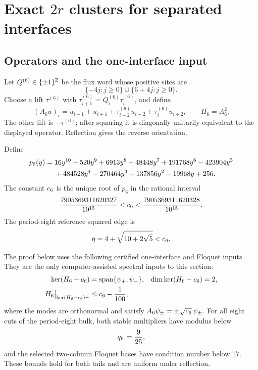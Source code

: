 \section{Exact \texorpdfstring{\(2r\)}{2r} clusters for separated interfaces}
\label{sec:exact-2r}

\subsection{Operators and the one-interface input}

Let \(Q^{(6)}\in\{\pm1\}^{\mathbb Z}\) be the flux word whose positive sites are
\[
 \{ -4j:j\geq 0\}\cup\{6+4j:j\geq0\}.
\]
Choose a lift \(\tau^{(6)}\) with
\(\tau^{(6)}_{i+1}=Q^{(6)}_i\tau^{(6)}_i\), and define
\begin{equation}
 (A_6u)_i=u_{i-1}+u_{i+1}
 +\tau^{(6)}_{i-2}u_{i-2}+\tau^{(6)}_iu_{i+2},
 \qquad H_6=A_6^2 .
 \label{eq:g6-operator}
\end{equation}
The other lift is \(-\tau^{(6)}\); after squaring it is diagonally unitarily
equivalent to the displayed operator.  Reflection gives the reverse
orientation.

Define
\begin{align}
 p_6(y)={}&16y^{10}-520y^9+6913y^8-48448y^7+191768y^6
 -423904y^5 \notag\\
 &+484528y^4-270464y^3+137856y^2-19968y+256.
 \label{eq:p6}
\end{align}
The constant \(c_6\) is the unique root of \(p_6\) in the rational
interval
\begin{equation}
 \frac{7905369311620327}{10^{15}}<c_6<
 \frac{7905369311620328}{10^{15}}.
 \label{eq:c6-interval}
\end{equation}
The period-eight reference squared edge is
\begin{equation}
 \eta=4+\sqrt{10+2\sqrt5}<c_6.
 \label{eq:eta}
\end{equation}

The proof below uses the following certified one-interface and Floquet
inputs.  They are the only computer-assisted spectral inputs to this
section:
\begin{align}
 \ker(H_6-c_6)&=\operatorname{span}\{\psi_+,\psi_-\},
 &\dim\ker(H_6-c_6)&=2, \label{eq:rank-two-input}\\
 H_6\big|_{\ker(H_6-c_6)^\perp}&\leq c_6-\frac1{100},
 \label{eq:complement-input}
\end{align}
where the modes are orthonormal and satisfy
\(A_6\psi_\pm=\pm\sqrt{c_6}\,\psi_\pm\).  For all eight cuts of the
period-eight bulk, both stable multipliers have modulus below
\begin{equation}
 q_{\mathrm F}=\frac9{25},
 \label{eq:qf}
\end{equation}
and the selected two-column Floquet bases have condition number below
\(17\).  These bounds hold for both tails and are uniform under reflection.

